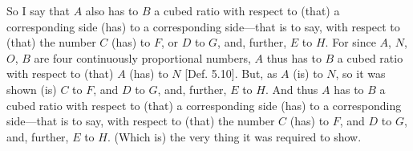 \begin{Parallel}{}{}
{So I say that $A$ also has to $B$ a cubed ratio with respect to (that)
a corresponding side (has) to a corresponding side---that is to say, with respect to (that) the number $C$ (has) to $F$, or $D$ to $G$, and, further,  $E$ to $H$. For
since $A$, $N$, $O$, $B$ are four continuously proportional numbers,
$A$ thus has to $B$	a cubed ratio with respect to (that) $A$ (has)
to $N$ [Def. 5.10]. But, as $A$ (is) to $N$, so
it was shown (is) $C$ to $F$, and $D$ to $G$, and, further, $E$ to $H$. And thus $A$ has to $B$ a cubed ratio with respect to (that) a corresponding
side (has) to a corresponding side---that is to say, with respect to
(that) the number $C$ (has) to $F$, and $D$ to $G$, and, further, $E$ to
$H$. (Which is) the very thing it was required to show.}
\end{Parallel}


\vspace{7pt}{\footnotesize\noindent$^\dag$  Literally, ``triple''.}

